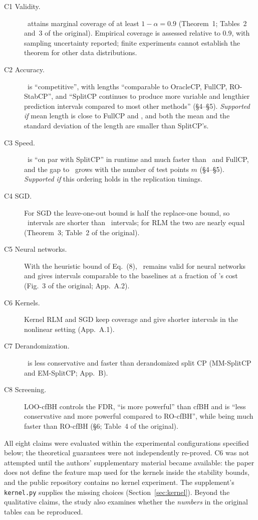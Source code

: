\begin{description}
\item[C1 Validity.] \LOO\ attains marginal coverage of at least $1-\alpha=0.9$ (Theorem~1; Tables~2 and~3 of the
  original). Empirical coverage is assessed relative to 0.9, with sampling uncertainty reported; finite experiments cannot establish the theorem for other data distributions.
\item[C2 Accuracy.] \LOO\ is ``competitive'', with lengths ``comparable to OracleCP, FullCP, RO-StabCP'', and
  ``SplitCP continues to produce more variable and lengthier prediction intervals compared to most other methods''
  (§4--§5). \emph{Supported if} mean length is close to FullCP and \RO, and both the mean and the standard
  deviation of the length are smaller than SplitCP's.
\item[C3 Speed.] \LOO\ is ``on par with SplitCP'' in runtime and much faster than \RO\ and FullCP, and the gap
  to \RO\ grows with the number of test points $m$ (§4--§5). \emph{Supported if} this ordering holds in the replication
  timings.
\item[C4 SGD.] For SGD the leave-one-out bound is half the replace-one bound, so \LOO\ intervals are shorter than
  \RO\ intervals; for RLM the two are nearly equal (Theorem~3; Table~2 of the original).
\item[C5 Neural networks.] With the heuristic bound of Eq.~(8), \LOO\ remains valid for neural networks and gives
  intervals comparable to the baselines at a fraction of \RO's cost (Fig.~3 of the original; App.~A.2).
\item[C6 Kernels.] Kernel RLM and SGD keep coverage and give shorter intervals in the nonlinear setting (App.~A.1).
\item[C7 Derandomization.] \LOO\ is less conservative and faster than derandomized split CP
  (MM-SplitCP\supercite{solari2022multi} and EM-SplitCP\supercite{gasparin2024merging}; App.~B).
\item[C8 Screening.] LOO-cfBH controls the FDR, ``is more powerful'' than cfBH\supercite{jin2023selection}
  and is ``less conservative and more powerful compared to RO-cfBH'', while being much faster than RO-cfBH (§6;
  Table~4 of the original).
\end{description}

All eight claims were evaluated within the experimental configurations specified below; the theoretical guarantees were not independently re-proved. C6 was not attempted until the authors' supplementary material became available: the paper
does not define the feature map used for the kernels inside the stability bounds, and the public repository contains
no kernel experiment. The supplement's \texttt{kernel.py} supplies the missing choices (Section~\ref{sec:kernel}).
Beyond the qualitative claims, the study also examines whether the \emph{numbers} in the original tables can be
reproduced.

